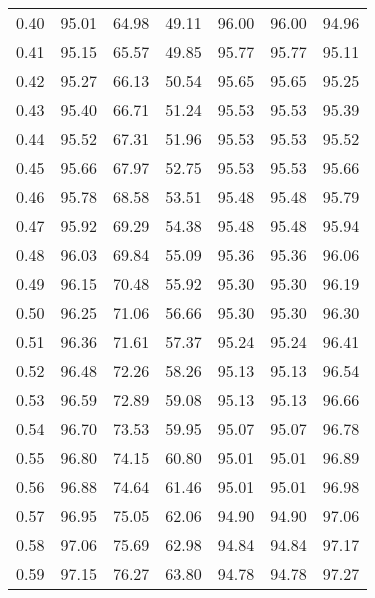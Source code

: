 \begin{tabular}{|c|c|c|c|c|c|c|}
      0.40 &     95.01 &     64.98 &      49.11 &   96.00 &      96.00 &         94.96 \\
      0.41 &     95.15 &     65.57 &      49.85 &   95.77 &      95.77 &         95.11 \\
      0.42 &     95.27 &     66.13 &      50.54 &   95.65 &      95.65 &         95.25 \\
      0.43 &     95.40 &     66.71 &      51.24 &   95.53 &      95.53 &         95.39 \\
      0.44 &     95.52 &     67.31 &      51.96 &   95.53 &      95.53 &         95.52 \\
      0.45 &     95.66 &     67.97 &      52.75 &   95.53 &      95.53 &         95.66 \\
      0.46 &     95.78 &     68.58 &      53.51 &   95.48 &      95.48 &         95.79 \\
      0.47 &     95.92 &     69.29 &      54.38 &   95.48 &      95.48 &         95.94 \\
      0.48 &     96.03 &     69.84 &      55.09 &   95.36 &      95.36 &         96.06 \\
      0.49 &     96.15 &     70.48 &      55.92 &   95.30 &      95.30 &         96.19 \\
      0.50 &     96.25 &     71.06 &      56.66 &   95.30 &      95.30 &         96.30 \\
      0.51 &     96.36 &     71.61 &      57.37 &   95.24 &      95.24 &         96.41 \\
      0.52 &     96.48 &     72.26 &      58.26 &   95.13 &      95.13 &         96.54 \\
      0.53 &     96.59 &     72.89 &      59.08 &   95.13 &      95.13 &         96.66 \\
      0.54 &     96.70 &     73.53 &      59.95 &   95.07 &      95.07 &         96.78 \\
      0.55 &     96.80 &     74.15 &      60.80 &   95.01 &      95.01 &         96.89 \\
      0.56 &     96.88 &     74.64 &      61.46 &   95.01 &      95.01 &         96.98 \\
      0.57 &     96.95 &     75.05 &      62.06 &   94.90 &      94.90 &         97.06 \\
      0.58 &     97.06 &     75.69 &      62.98 &   94.84 &      94.84 &         97.17 \\
      0.59 &     97.15 &     76.27 &      63.80 &   94.78 &      94.78 &         97.27 \\

\end{tabular}
